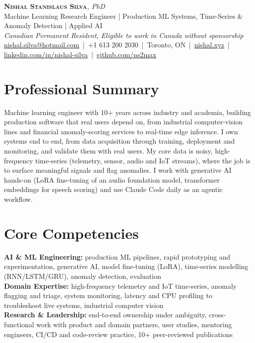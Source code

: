 \documentclass[11pt]{article}
\makeatletter
\newcommand{\cvName}{Nishal Stanislaus Silva}
\newcommand{\cvEmail}{nishal.silva@hotmail.com}
\newcommand{\cvPhone}{+1 613 200 2030}
\newcommand{\cvCity}{Toronto, ON}
\newcommand{\cvSite}{https://nishal.xyz}
\newcommand{\cvLinkedIn}{https://www.linkedin.com/in/nishal-silva}
\newcommand{\cvGitHub}{https://github.com/ns2max}
\newcommand{\cvStatus}{Canadian Permanent Resident, Eligible to work in Canada without sponsorship}
\newcommand{\cvTagline}{Machine Learning Research Engineer | Production ML Systems, Time-Series \& Anomaly Detection | Applied AI}
\makeatother
\begin{document}
\pagestyle{empty}

\begin{center}
    {\LARGE \scshape \textbf{\cvName}}{\large \textit{, PhD}}
    \\[1pt]
    {\small \cvTagline}
    \\[1pt]
    {\footnotesize\textit{\cvStatus}}
    \\[1pt]
    {\small
    \href{mailto:\cvEmail}{\cvEmail}
    \,|\, \cvPhone
    \,|\, \cvCity
    \,|\, \href{\cvSite}{nishal.xyz}
    \,|\, \href{\cvLinkedIn}{linkedin.com/in/nishal-silva}
    \,|\, \href{\cvGitHub}{github.com/ns2max}}
\end{center}

\section*{Professional Summary}
Machine learning engineer with 10+ years across industry and academia, building production software that real users depend on, from industrial computer-vision lines and financial anomaly-scoring services to real-time edge inference. I own systems end to end, from data acquisition through training, deployment and monitoring, and validate them with real users. My core data is noisy, high-frequency time-series (telemetry, sensor, audio and IoT streams), where the job is to surface meaningful signals and flag anomalies. I work with generative AI hands-on (LoRA fine-tuning of an audio foundation model, transformer embeddings for speech scoring) and use Claude Code daily as an agentic workflow.

\section*{Core Competencies}
\textbf{AI \& ML Engineering:} production ML pipelines, rapid prototyping and experimentation, generative AI, model fine-tuning (LoRA), time-series modelling (RNN/LSTM/GRU), anomaly detection, evaluation\\
\textbf{Domain Expertise:} high-frequency telemetry and IoT time-series, anomaly flagging and triage, system monitoring, latency and CPU profiling to troubleshoot live systems, industrial computer vision\\
\textbf{Research \& Leadership:} end-to-end ownership under ambiguity, cross-functional work with product and domain partners, user studies, mentoring engineers, CI/CD and code-review practice, 10+ peer-reviewed publications
\end{document}
